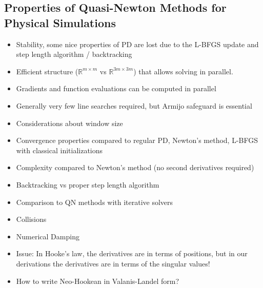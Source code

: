 \subsection{Properties of Quasi-Newton Methods for Physical Simulations}\label{ss:properties-qn}
\begin{itemize}
    \item Stability, some nice properties of PD are lost due to the L-BFGS update and step length algorithm / backtracking
    \item Efficient structure ($\mathbb{R}^{m \times m}$ vs $\mathbb{R}^{3m \times 3m}$) that allows solving in parallel.
    \item Gradients and function evaluations can be computed in parallel
    \item Generally very few line searches required, but Armijo safeguard is essential
    \item Considerations about window size
    \item Convergence properties compared to regular PD, Newton's method, L-BFGS with classical initializations
    \item Complexity compared to Newton's method (no second derivatives required)
    \item Backtracking vs proper step length algorithm 
    \item Comparison to QN methods with iterative solvers
    \item Collisions
    \item Numerical Damping
    \item Issue: In Hooke's law, the derivatives are in terms of positions, but in our derivations the derivatives are in terms of the 
        singular values!
    \item How to write Neo-Hookean in Valanis-Landel form?
\end{itemize}








